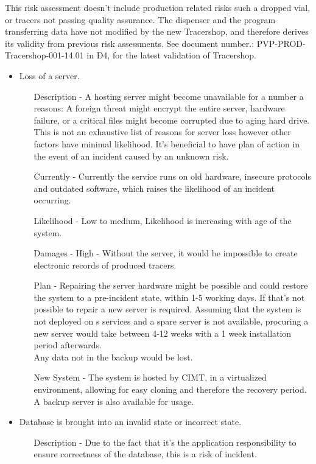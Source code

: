 \documentclass{article}
\begin{document}
This risk assessment doesn't include production related risks such a dropped vial, or tracers not passing quality assurance.
The dispenser and the program transferring data have not modified by the new Tracershop, and therefore derives its validity from previous risk assessments.
See document number.: PVP-PROD-Tracershop-001-14.01 in D4, for the latest validation of Tracershop.

\begin{itemize}
  \item Loss of a server.
  \begin{itemize}
    \item[Description] - A hosting server might become unavailable for a number a reasons:
    A foreign threat might encrypt the entire server, hardware failure, or a critical files might become corrupted due to aging hard drive.
    This is not an exhaustive list of reasons for server loss however other factors have minimal likelihood.
    It's beneficial to have plan of action in the event of an incident caused by an unknown risk.
    \item[Currently] - Currently the service runs on old hardware, insecure protocols and outdated software,
    which raises the likelihood of an incident occurring.
    \item[Likelihood] - Low to medium, Likelihood is increasing with age of the system.
    \item[Damages] - High - Without the server, it would be impossible to create electronic records of produced tracers.
    \item[Plan] - Repairing the server hardware might be possible and could restore the system to a pre-incident state, within 1-5 working days.
    If that's not possible to repair a new server is required. Assuming that the system is not deployed on s services and a spare server is not available, procuring a new server would take between 4-12 weeks with a 1 week installation period afterwards.\\
    Any data not in the backup would be lost.
    \item[New System] - The system is hosted by CIMT, in a virtualized environment, allowing for easy cloning and therefore the recovery period. A backup server is also available for usage.
  \end{itemize}
  \item Database is brought into an invalid state or incorrect state.
  \begin{itemize}
    \item[Description] - Due to the fact that it's the application responsibility to ensure correctness of the database, this is a risk of incident.\\

\end{itemize}
\end{itemize}
\end{document}
